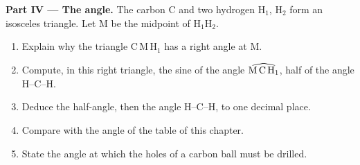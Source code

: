 \begin{problem}
\medskip
\noindent\textbf{Part IV --- The angle.}
The carbon  C and two hydrogen  H$_1$, H$_2$ form an isosceles
triangle. Let M be the midpoint of H$_1$H$_2$.
\begin{enumerate}[resume]
  \item Explain why the triangle C\,M\,H$_1$ has a right angle at M.
  \item Compute, in this right triangle, the sine of the angle
        $\widehat{\text{M\,C\,H}_1}$, half of the angle H--C--H.
  \item Deduce the half-angle, then the angle H--C--H, to one decimal
        place.
  \item Compare with the angle of the table of this chapter.
  \item State the angle at which the holes of a carbon ball must be
        drilled.
\end{enumerate}
\end{problem}
